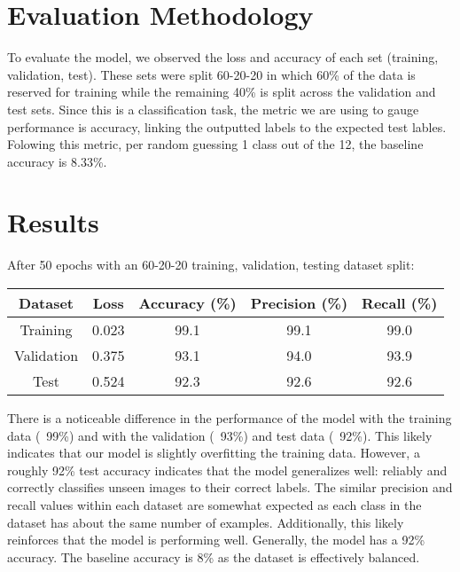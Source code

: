 \documentclass[10pt]{article}
\begin{document}
\section{Evaluation Methodology}

\indent To evaluate the model, we observed the loss and accuracy of each set (training, validation, test). These sets were split 60-20-20 in which 60\% of the data is reserved for training while the remaining 40\% is split across the validation and test sets. Since this is a classification task, the metric we are using to gauge performance is accuracy, linking the outputted labels to the expected test lables. Folowing this metric, per random guessing 1 class out of the 12, the baseline accuracy is 8.33\%.




\section{Results}

\indent After 50 epochs with an 60-20-20 training, validation, testing dataset split:
 
\begin{center}
\begin{tabular}{|c c c c c|} 
 \hline
 Dataset & Loss & Accuracy (\%) & Precision (\%) & Recall (\%) \\ 
 \hline
 Training & 0.023 & 99.1 & 99.1 & 99.0 \\ 
 \hline
 Validation & 0.375 & 93.1 & 94.0 & 93.9 \\ 
 \hline
 Test & 0.524 & 92.3 & 92.6 & 92.6 \\ 
\hline
\end{tabular}
\end{center}

\indent There is a noticeable difference in the performance of the model with the training data (~99\%) and with the validation (~93\%) and test data (~92\%). This likely indicates that our model is slightly overfitting the training data. However, a roughly 92\% test accuracy indicates that the model generalizes well: reliably and correctly classifies unseen images to their correct labels. The similar precision and recall values within each dataset are somewhat expected as each class in the dataset has about the same number of examples. Additionally, this likely reinforces that the model is performing well. Generally, the model has a 92\% accuracy. The baseline accuracy is 8\% as the dataset is effectively balanced.
\end{document}
